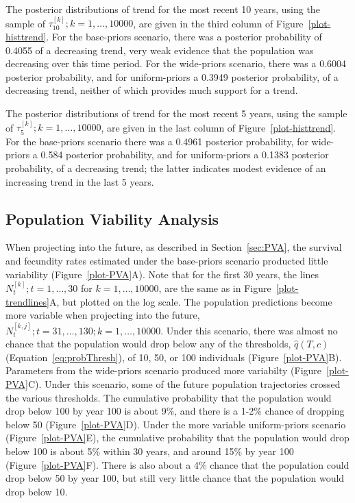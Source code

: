 \documentclass[12pt, titlepage]{article}\usepackage[]{graphicx}\usepackage[]{color}
\begin{document}
The posterior distributions of trend for the most recent 10 years, using the sample of $\tau^{[k]}_{10}; k = 1,\ldots,10000$, are given in the third column of Figure~\ref{plot-histtrend}.  For the base-priors scenario, there was a posterior probability of 0.4055 of a decreasing trend, very weak evidence that the population was decreasing over this time period. For the wide-priors scenario, there was a 0.6004 posterior probability, and for uniform-priors a 0.3949 posterior probability, of a decreasing trend, neither of which provides much support for a trend. 

The posterior distributions of trend for the most recent 5 years, using the sample of $\tau^{[k]}_{5}; k = 1,\ldots,10000$, are given in the last column of Figure~\ref{plot-histtrend}.  For the base-priors scenario there was a 0.4961 posterior probability, for wide-priors a 0.584 posterior probability, and for uniform-priors a 0.1383 posterior probability, of a decreasing trend; the latter indicates modest evidence of an increasing trend in the last 5 years.


\subsection{Population Viability Analysis}

When projecting into the future, as described in Section~\ref{sec:PVA}, the survival and fecundity rates estimated under the base-priors scenario producted little variability (Figure~\ref{plot-PVA}A). Note that for the first 30 years, the lines $N^{[k]}_t; t = 1,\ldots,30$ for $k = 1,\ldots,10000$, are the same as in Figure~\ref{plot-trendlines}A, but plotted on the log scale. The population predictions become more variable when projecting into the future, $N^{[k,j]}_t; t = 31,\ldots,130; k=1,\ldots,10000$. Under this scenario, there was almost no chance that the population would drop below any of the thresholds, $\hat{q}(T,c)$ (Equation~\ref{eq:probThresh}), of 10, 50, or 100 individuals (Figure~\ref{plot-PVA}B). Parameters from the wide-priors scenario produced more variabilty (Figure~\ref{plot-PVA}C). Under this scenario, some of the future population trajectories crossed the various thresholds. The cumulative probability that the population would drop below 100 by year 100 is about 9\%, and there is a 1-2\% chance of dropping below 50 (Figure~\ref{plot-PVA}D). Under the more variable uniform-priors scenario (Figure~\ref{plot-PVA}E), the cumulative probability that the population would drop below 100 is about 5\% within 30 years, and around 15\% by year 100 (Figure~\ref{plot-PVA}F).  There is also about a 4\% chance that the population could drop below 50 by year 100, but still very little chance that the population would drop below 10.
\end{document}
